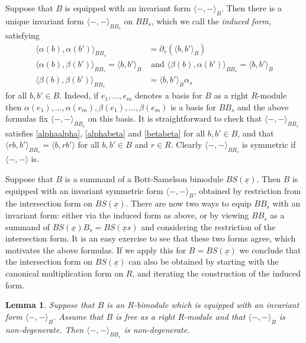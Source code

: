 \documentclass[11pt]{amsart}
\numberwithin{equation}{section}
\def\a{\alpha}
\def\b{\beta}
\def\un{\underline}
\newtheorem{lem}[thm]{Lemma}
\theoremstyle{definition}
\theoremstyle{remark}
\begin{document}
Suppose that $B$ is equipped with an invariant form $\langle -, -
\rangle_B$. Then there is a unique invariant form $\langle -, -
\rangle_{BB_s}$ on $BB_s$, which we call the
\emph{induced form},
satisfying
\begin{align} \label{alphaalpha}
\langle \a(b), \a(b') \rangle_{BB_s} &= \partial_s(\langle b, b' \rangle_B)\\
\langle \a(b), \b(b') \rangle_{BB_s} = \langle b, b' \rangle_B &\text{ and }  \label{alphabeta}
\langle \b(b), \a(b') \rangle_{BB_s} = \langle b, b' \rangle_B \\
\langle \b(b), \b(b') \rangle_{BB_s} &= \langle b, b' \rangle_B \alpha_s \label{betabeta}
\end{align}
for all $b, b' \in B$. Indeed, if $e_1, \dots, e_m$ denotes a basis for $B$ as a right $R$-module then $\a(e_1), \dots, \a(e_m), \b(e_1), \dots, \b(e_m)$ is a basis for $BB_s$ and
the above formulas fix $\langle -, - \rangle_{BB_s}$ on this basis. It is straightforward to check that $\langle -, - \rangle_{BB_s}$ satisfies \eqref{alphaalpha}, \eqref{alphabeta}
and \eqref{betabeta} for all $b, b' \in B$, and that $\langle rb, b'
\rangle_{BB_s} = \langle b, rb' \rangle$ for all $b, b' \in B$ and $r
\in R$. Clearly $\langle -, - \rangle_{BB_s}$ is symmetric if $\langle
-, - \rangle$ is.


Suppose that $B$ is a summand of a Bott-Samelson bimodule $BS(\un{x})$. Then $B$ is equipped with an invariant symmetric form $\langle -, - \rangle_B$, obtained by restriction from the
intersection form on $BS(\un{x})$. There are now two ways to equip $BB_s$ with an invariant form: either via the induced form as above, or by viewing $BB_s$ as a summand of $BS(\un{x})B_s
= BS(\un{x}s)$ and considering the restriction of the intersection
form. It is an easy exercise to see that these two forms agree, which motivates
the above formulas. If we apply this for $B =
BS(\un{x})$ we conclude that the intersection form on
$BS(\un{x})$ can also be obtained by starting with the canonical
multiplication form on $R$, and iterating the construction of the
induced form.

\begin{lem} \label{lem:induced non-degen} Suppose that $B$ is an
  $R$-bimodule which is equipped with an invariant form $\langle -, -
  \rangle_B$. Assume that $B$ is free as a right $R$-module and that $\langle -, -
  \rangle_B$ is non-degenerate. Then $\langle -, - \rangle_{BB_s}$ is
  non-degenerate. \end{lem}
\end{document}
